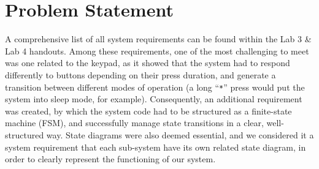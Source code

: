 
\section{Problem Statement}
\label{section:problem-statement}
A comprehensive list of all system requirements can be found within the Lab 3 \& Lab 4 handouts. Among these requirements, one of the most challenging to meet was one related to the keypad, as it showed that the system had to respond differently to buttons depending on their press duration, and generate a transition between different modes of operation (a long “\verb|*|” press would put the system into sleep mode, for example). Consequently, an additional requirement was created, by which the system code had to be structured as a finite-state machine (FSM), and successfully manage state transitions in a clear, well-structured way. State diagrams were also deemed essential, and we considered it a system requirement that each sub-system have its own related state diagram, in order to clearly represent the functioning of our system.
